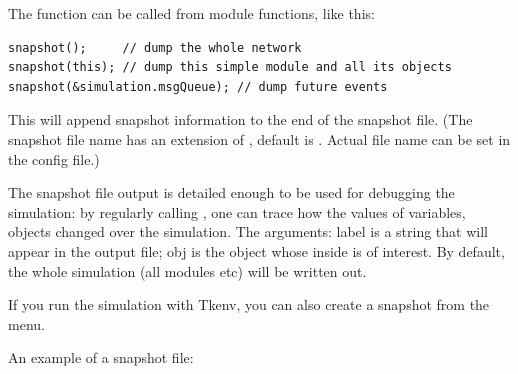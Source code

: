 The function can be called from module functions, like this:

\begin{verbatim}
snapshot();     // dump the whole network
snapshot(this); // dump this simple module and all its objects
snapshot(&simulation.msgQueue); // dump future events
\end{verbatim}

This will append snapshot information to the end of the snapshot file.
(The snapshot file name has an extension of , default is
. Actual file name can be set in the
config file.)


The snapshot file output is detailed enough to be used for debugging
the simulation: by regularly calling , one can trace
how the values of variables, objects changed over the simulation.
The arguments: label is a string that will appear in the output
file; obj is the object whose inside is of interest. By default,
the whole simulation (all modules etc) will be written out.

If you run the simulation with Tkenv, you can also create a snapshot
from the menu.


An example of a snapshot file:

